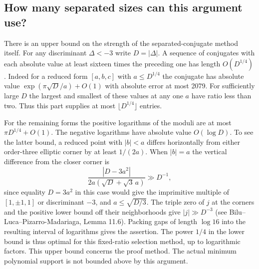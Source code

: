 \documentclass[11pt]{article}
\theoremstyle{remark}\newtheorem{remark}[theorem]{Remark}
\begin{document}





\subsection{How many separated sizes can this argument use?}
There is an upper bound on the strength of the separated-conjugate method itself. For any discriminant $\Delta<-3$ write $D=|\Delta|$. A sequence of conjugates with each absolute value at least sixteen times the preceding one has length $O(D^{1/4})$.
Indeed for a reduced form $[a,b,c]$ with $a\le D^{1/4}$ the conjugate has absolute value $\exp(\pi\sqrt D/a)+O(1)$ with absolute error at most 2079. For sufficiently large $D$ the largest and smallest of these values at any one $a$ have ratio less than two. Thus this part supplies at most $\lfloor D^{1/4}\rfloor$ entries.

For the remaining forms the positive logarithms of the moduli are at most $\pi D^{1/4}+O(1)$. The negative logarithms have absolute value $O(\log D)$. To see the latter bound, a reduced point with $|b|<a$ differs horizontally from either order-three elliptic corner by at least $1/(2a)$. When $|b|=a$ the vertical difference from the closer corner is
\[
 \frac{|D-3a^2|}{2a(\sqrt D+\sqrt3\,a)}\gg D^{-1},
\]
since equality $D=3a^2$ in this case would give the imprimitive multiple of $[1,\pm1,1]$ or discriminant $-3$, and $a\le\sqrt{D/3}$. The triple zero of $j$ at the corners and the positive lower bound off their neighborhoods give $|j|\gg D^{-3}$ (see Bilu--Luca--Pizarro-Madariaga, Lemma 11.6). Packing gaps of length $\log16$ into the resulting interval of logarithms gives the assertion. The power $1/4$ in the lower bound is thus optimal for this fixed-ratio selection method, up to logarithmic factors. This upper bound concerns the proof method. The actual minimum polynomial support is not bounded above by this argument.




\end{document}
